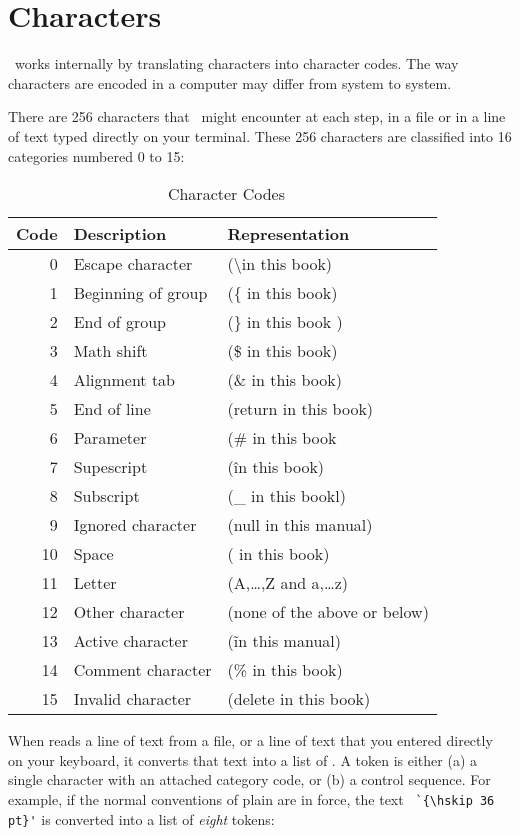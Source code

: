 \chapter{Characters}

\normalsize\parindent

\tex\ works internally by translating characters into character codes. The way characters are encoded in a computer
may differ from system to system.


There are 256 characters that \tex\  might encounter at
each step, in a file or in a line of text typed directly on your terminal. These
256 characters are classified into 16 categories numbered 0 to 15:

\begin{table}[htbp]
\centering
\begin{tabular}{rll}
\toprule
Code & Description & Representation\\
\midrule
0 &  Escape character & (\textbackslash in this book)\\
1 & Beginning of group & (\{ in this book)\\
2 & End of group & (\} in this book )\\
3 & Math shift & (\$ in this book)\\
4 & Alignment tab & (\& in this book)\\
5 & End of line &(return in this book)\\
6 & Parameter &(\# in this book\\
7 & Supescript &(\^ in this book)\\
8 & Subscript &(\_ in this bookl)\\
9 & Ignored character &(null in this manual)\\
10 & Space &(\char32 in this book)\\
11 &Letter &(A,\ldots,Z and a,\ldots z)\\
12 &Other character &(none of the above or below)\\
13 &Active character &(\~ in this manual)\\
14 &Comment character &(\% in this book)\\
15 &Invalid character &(delete in this book)\\
\bottomrule
\end{tabular}
\caption{\tex\ Character Codes}
\end{table}
\medskip

When \tex reads a line of text from a file, or a line of text that you entered
directly on your keyboard, it converts that text into a list of \cmd{\tokens}. A
token is either (a) a single character with an attached category code, or (b) a control
sequence. For example, if the normal conventions of plain \tex  are in force, the text
\verb*+ `{\hskip 36 pt}'+  is converted into a list of \textit{eight} tokens:
\medskip

